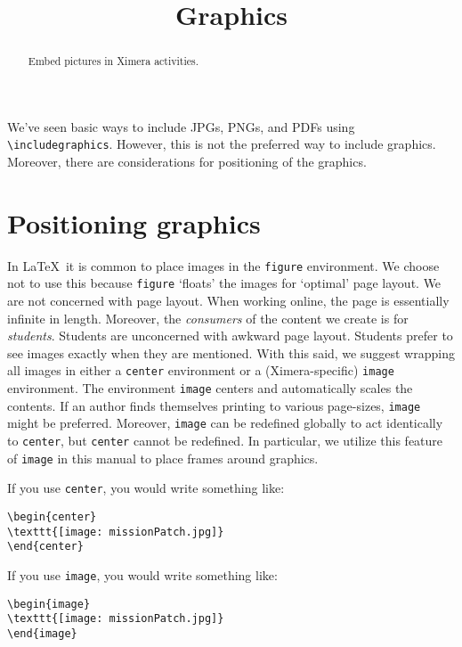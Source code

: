 \documentclass{ximera}
\title{Graphics}
\begin{document}
\begin{abstract}
  Embed pictures in Ximera activities.
\end{abstract}
\maketitle

We've seen basic ways to include JPGs, PNGs, and PDFs using
\verb!\includegraphics!. However, this is not the preferred way to include
graphics. Moreover, there are considerations for positioning of the graphics.

\section{Positioning graphics}

In \LaTeX\ it is common to place images in the \verb!figure! environment. We
choose not to use this because \verb!figure! `floats' the images for `optimal'
page layout. We are not concerned with page layout. When working online, the
page is essentially infinite in length. Moreover, the \textit{consumers} of the
content we create is for \textit{students}. Students are  unconcerned with
awkward page layout. Students prefer to see images exactly when they are
mentioned. With this said, we suggest wrapping all images in either a
\verb!center! environment or a (Ximera-specific) \verb!image! environment.
The environment \verb!image! centers and automatically scales the contents.  If
an author finds themselves printing to various page-sizes, \verb!image! might
be preferred. Moreover, \verb!image! can be redefined globally to act
identically to \verb!center!, but \verb!center! cannot be redefined. In
particular, we utilize this feature of \verb!image! in this manual to place frames around graphics.

If you use \verb!center!, you would write something like:
\begin{verbatim}
\begin{center}
\texttt{[image: missionPatch.jpg]}
\end{center}
\end{verbatim}
If you use \verb!image!, you would write something like:
\begin{verbatim}
\begin{image}
\texttt{[image: missionPatch.jpg]}
\end{image}
\end{verbatim}
\end{document}
